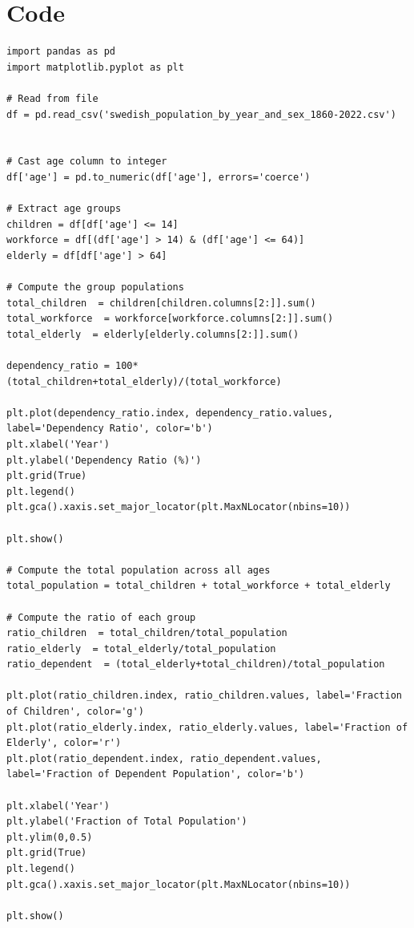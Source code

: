 \documentclass[a4paper]{article}
\begin{document}
\printbibliography
\appendix

\section*{Code}
\label{app:code}

\begin{lstlisting}
import pandas as pd
import matplotlib.pyplot as plt

# Read from file
df = pd.read_csv('swedish_population_by_year_and_sex_1860-2022.csv')


# Cast age column to integer
df['age'] = pd.to_numeric(df['age'], errors='coerce')

# Extract age groups
children = df[df['age'] <= 14]
workforce = df[(df['age'] > 14) & (df['age'] <= 64)]
elderly = df[df['age'] > 64]

# Compute the group populations
total_children  = children[children.columns[2:]].sum()
total_workforce  = workforce[workforce.columns[2:]].sum()
total_elderly  = elderly[elderly.columns[2:]].sum()

dependency_ratio = 100*(total_children+total_elderly)/(total_workforce)

plt.plot(dependency_ratio.index, dependency_ratio.values, label='Dependency Ratio', color='b')
plt.xlabel('Year')
plt.ylabel('Dependency Ratio (%)')
plt.grid(True)
plt.legend()
plt.gca().xaxis.set_major_locator(plt.MaxNLocator(nbins=10))

plt.show()

# Compute the total population across all ages
total_population = total_children + total_workforce + total_elderly

# Compute the ratio of each group
ratio_children  = total_children/total_population
ratio_elderly  = total_elderly/total_population
ratio_dependent  = (total_elderly+total_children)/total_population

plt.plot(ratio_children.index, ratio_children.values, label='Fraction of Children', color='g')
plt.plot(ratio_elderly.index, ratio_elderly.values, label='Fraction of Elderly', color='r')
plt.plot(ratio_dependent.index, ratio_dependent.values, label='Fraction of Dependent Population', color='b')

plt.xlabel('Year')
plt.ylabel('Fraction of Total Population')
plt.ylim(0,0.5)
plt.grid(True)
plt.legend()
plt.gca().xaxis.set_major_locator(plt.MaxNLocator(nbins=10))

plt.show()

\end{lstlisting}
\end{document}
